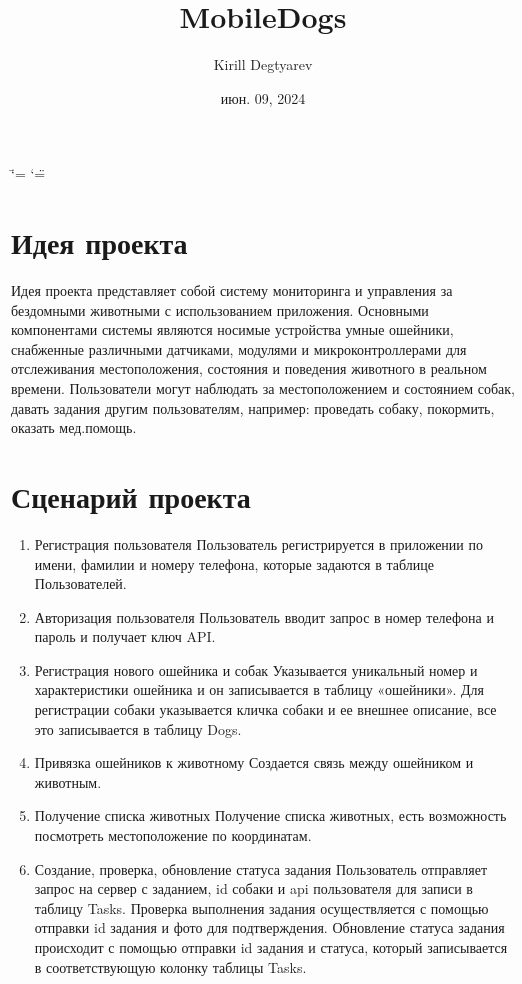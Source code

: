 \documentclass[letterpaper,10pt,russian]{sphinxmanual}
\title{MobileDogs}
\date{июн. 09, 2024}
\author{Kirill Degtyarev}
\begin{document}
\ifdefined\shorthandoff
  \ifnum\catcode`\=\string=\active\shorthandoff{=}\fi
  \ifnum\catcode`\"=\active{}\fi
\fi

\pagestyle{empty}
\sphinxmaketitle
\pagestyle{plain}
\sphinxtableofcontents
\pagestyle{normal}
\label{\detokenize{index::doc}}



\chapter{Идея проекта}
\label{\detokenize{index:id1}}
\sphinxAtStartPar
Идея проекта представляет собой систему мониторинга и управления за бездомными животными с использованием приложения. Основными компонентами системы являются носимые устройства \sphinxhyphen{} умные ошейники, снабженные различными датчиками, модулями и микроконтроллерами для отслеживания местоположения, состояния и поведения животного в реальном времени. Пользователи могут наблюдать за местоположением и состоянием собак, давать задания другим пользователям, например: проведать собаку, покормить, оказать мед.помощь.


\chapter{Сценарий проекта}
\label{\detokenize{index:id2}}\begin{enumerate}
%
\item {} 
\sphinxAtStartPar
Регистрация пользователя
Пользователь регистрируется в приложении по имени, фамилии и номеру телефона, которые задаются в таблице Пользователей.

\item {} 
\sphinxAtStartPar
Авторизация пользователя
Пользователь вводит запрос в номер телефона и пароль и получает ключ API.

\item {} 
\sphinxAtStartPar
Регистрация нового ошейника и собак
Указывается уникальный номер и характеристики ошейника и он записывается в таблицу «ошейники». Для регистрации собаки указывается кличка собаки и ее внешнее описание, все это записывается в таблицу Dogs.

\item {} 
\sphinxAtStartPar
Привязка ошейников к животному
Создается связь между ошейником и животным.

\item {} 
\sphinxAtStartPar
Получение списка животных
Получение списка животных, есть возможность посмотреть местоположение по координатам.

\item {} 
\sphinxAtStartPar
Создание, проверка, обновление статуса задания
Пользователь отправляет запрос на сервер с заданием, id собаки и api пользователя для записи в таблицу Tasks. Проверка выполнения задания осуществляется с помощью отправки id задания и фото для подтверждения. Обновление статуса задания происходит с помощью отправки id задания и статуса, который записывается в соответствующую колонку таблицы Tasks.

\end{enumerate}
\end{document}
